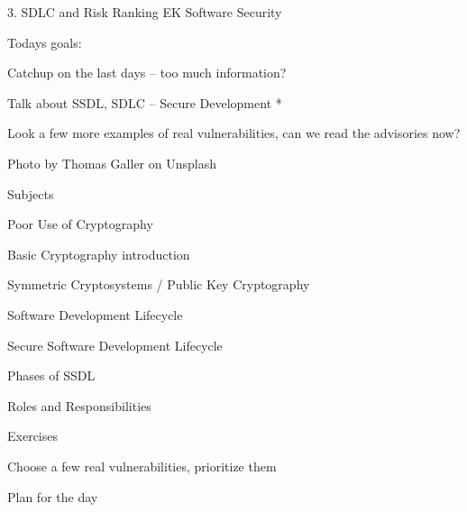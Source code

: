 \documentclass[Screen16to9,17pt]{foils}
\begin{document}
\mytitlepage
{3. SDLC and Risk Ranking}
{EK  Software Security}



Todays goals:
\begin{list2}
\item Catchup on the last days -- too much information?
\item Talk about SSDL, SDLC -- Secure Development *
\item Look a few more examples of real vulnerabilities, can we read the advisories now?
\end{list2}

  Photo by Thomas Galler on Unsplash




\begin{list1}
\item Subjects
\begin{list2}
\item Poor Use of Cryptography
\item Basic Cryptography introduction
\item Symmetric Cryptosystems / Public Key Cryptography
\item Software Development Lifecycle
\item Secure Software Development Lifecycle
\item Phases of SSDL
\item Roles and Responsibilities
\end{list2}
\item Exercises
\begin{list2}
\item Choose a few real vulnerabilities, prioritize them
\end{list2}
\end{list1}



Plan for the day
\end{document}
